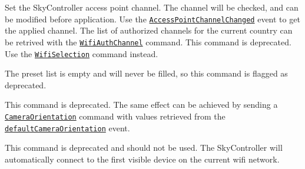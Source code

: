 \begin{DoxyRefList}
\item[\label{deprecated__deprecated000077}%
\hypertarget{deprecated__deprecated000077}{}%
Member \hyperlink{_a_r_c_o_n_t_r_o_l_l_e_r___feature_8h_af235daab761870adfa592335ae0ed7ca}{A\+R\+C\+O\+N\+T\+R\+O\+L\+L\+E\+R\+\_\+\+F\+E\+A\+T\+U\+R\+E\+\_\+\+Sky\+Controller\+\_\+\+Send\+Access\+Point\+Settings\+Access\+Point\+Channel\+\_\+t} )(\hyperlink{struct_a_r_c_o_n_t_r_o_l_l_e_r___f_e_a_t_u_r_e___sky_controller__t}{A\+R\+C\+O\+N\+T\+R\+O\+L\+L\+E\+R\+\_\+\+F\+E\+A\+T\+U\+R\+E\+\_\+\+Sky\+Controller\+\_\+t} $\ast$feature, uint8\+\_\+t channel)]Set the Sky\+Controller access point channel. The channel will be checked, and can be modified before application. Use the \href{#4-10-1}{\tt Access\+Point\+Channel\+Changed} event to get the applied channel. The list of authorized channels for the current country can be retrived with the \href{#4-1-4}{\tt Wifi\+Auth\+Channel} command. This command is deprecated. Use the \href{#4-9-2}{\tt Wifi\+Selection} command instead.  
\item[\label{deprecated__deprecated000079}%
\hypertarget{deprecated__deprecated000079}{}%
Member \hyperlink{_a_r_c_o_n_t_r_o_l_l_e_r___feature_8h_a3aaa59daef58d166881574ac8608a172}{A\+R\+C\+O\+N\+T\+R\+O\+L\+L\+E\+R\+\_\+\+F\+E\+A\+T\+U\+R\+E\+\_\+\+Sky\+Controller\+\_\+\+Send\+Axis\+Filters\+Get\+Preset\+Axis\+Filters\+\_\+t} )(\hyperlink{struct_a_r_c_o_n_t_r_o_l_l_e_r___f_e_a_t_u_r_e___sky_controller__t}{A\+R\+C\+O\+N\+T\+R\+O\+L\+L\+E\+R\+\_\+\+F\+E\+A\+T\+U\+R\+E\+\_\+\+Sky\+Controller\+\_\+t} $\ast$feature)]The preset list is empty and will never be filled, so this command is flagged as deprecated.  
\item[\label{deprecated__deprecated000078}%
\hypertarget{deprecated__deprecated000078}{}%
Member \hyperlink{_a_r_c_o_n_t_r_o_l_l_e_r___feature_8h_a073744a7c4fdaf9620aa6a62dc192363}{A\+R\+C\+O\+N\+T\+R\+O\+L\+L\+E\+R\+\_\+\+F\+E\+A\+T\+U\+R\+E\+\_\+\+Sky\+Controller\+\_\+\+Send\+Camera\+Reset\+Orientation\+\_\+t} )(\hyperlink{struct_a_r_c_o_n_t_r_o_l_l_e_r___f_e_a_t_u_r_e___sky_controller__t}{A\+R\+C\+O\+N\+T\+R\+O\+L\+L\+E\+R\+\_\+\+F\+E\+A\+T\+U\+R\+E\+\_\+\+Sky\+Controller\+\_\+t} $\ast$feature)]This command is deprecated. The same effect can be achieved by sending a \href{#1-1-0}{\tt Camera\+Orientation} command with values retrieved from the \href{#1-25-1}{\tt default\+Camera\+Orientation} event.  
\item[\label{deprecated__deprecated000076}%
\hypertarget{deprecated__deprecated000076}{}%
Member \hyperlink{_a_r_c_o_n_t_r_o_l_l_e_r___feature_8h_a0e368567c1d46eb7f910844144f9a902}{A\+R\+C\+O\+N\+T\+R\+O\+L\+L\+E\+R\+\_\+\+F\+E\+A\+T\+U\+R\+E\+\_\+\+Sky\+Controller\+\_\+\+Send\+Device\+Connect\+To\+Device\+\_\+t} )(\hyperlink{struct_a_r_c_o_n_t_r_o_l_l_e_r___f_e_a_t_u_r_e___sky_controller__t}{A\+R\+C\+O\+N\+T\+R\+O\+L\+L\+E\+R\+\_\+\+F\+E\+A\+T\+U\+R\+E\+\_\+\+Sky\+Controller\+\_\+t} $\ast$feature, char $\ast$device\+Name)]This command is deprecated and should not be used. The Sky\+Controller will automatically connect to the first visible device on the current wifi network.  

\end{DoxyRefList}
